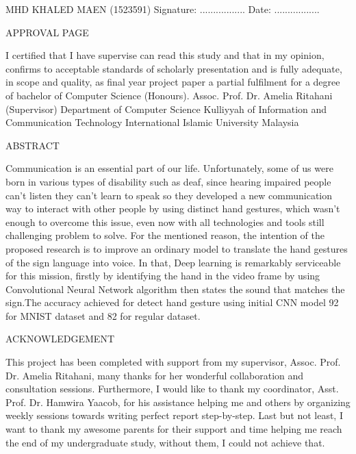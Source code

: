 \documentclass[12pt]{report}
\begin{document}
\mbox{}
\vfill
MHD KHALED MAEN (1523591)
\bigbreak
Signature: .................\hspace{18em} Date: .................
\bigbreak

\newpage
\begin{center}
    \LARGE APPROVAL PAGE
\end{center} 

I certified that I have supervise can read this study and that in my opinion,
confirms to acceptable standards of scholarly presentation and is fully adequate,
in scope and quality, as final year project paper a partial fulfilment for a 
degree of bachelor of Computer Science (Honours).
\mbox{}
\vfill
Assoc. Prof. Dr. Amelia Ritahani (Supervisor)
\bigbreak
Department of Computer Science
\bigbreak
Kulliyyah of Information and Communication Technology
\bigbreak
International Islamic University Malaysia
\bigbreak

\newpage

\begin{center}
    \LARGE ABSTRACT
\end{center}

Communication is an essential part of our life.
Unfortunately, some of us were born in various types of disability such as deaf,
since hearing impaired people can't listen they can't learn to speak so they developed 
a new communication way to interact with other people by using distinct hand gestures, 
which wasn't enough to overcome this issue, even now with all technologies and tools still challenging problem to solve.
For the mentioned reason, 
the intention of the proposed research is to improve an ordinary model to translate the hand gestures of the sign language into voice.
In that, Deep learning is remarkably serviceable for this mission, 
firstly by identifying the hand in the video frame by using Convolutional
Neural Network algorithm then states the sound that matches the sign.The accuracy achieved for detect hand gesture using initial CNN model 92 \text{\%} for MNIST
dataset and 82\text{\%} for regular dataset.


\newpage
\begin{center}
    \LARGE ACKNOWLEDGEMENT
\end{center} 

This project has been completed with support from my supervisor, Assoc. Prof. Dr. Amelia Ritahani, many thanks for her wonderful 
collaboration and consultation sessions. Furthermore, 
I would like to thank my coordinator, Asst. Prof. Dr. Hamwira Yaacob, for his 
assistance helping me and others by organizing weekly sessions towards writing perfect report step-by-step. 
Last but not least,
I want to thank my awesome parents for their support and time helping me reach the end of my undergraduate study, without them, I could not achieve that.
\end{document}
